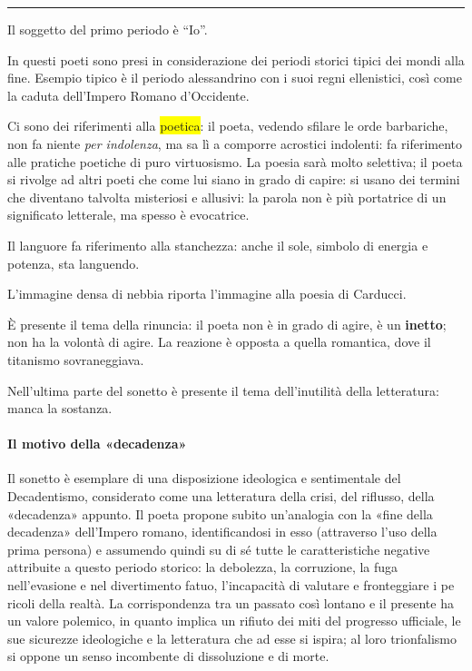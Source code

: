 \documentclass{book}
\newcommand{\pagine}[1]{\colorbox{yellow}{#1}}
\newcommand{\finepoesia}{\vspace*{1em}\hrule\vspace*{1em}}
\begin{document}
\finepoesia

Il soggetto del primo periodo è ``Io''.

In questi poeti sono presi in considerazione dei periodi storici tipici
dei mondi alla fine. Esempio tipico è il periodo alessandrino con i suoi
regni ellenistici, così come la caduta dell'Impero Romano d'Occidente.

Ci sono dei riferimenti alla \pagine{poetica}: il poeta, vedendo
sfilare le orde barbariche, non fa niente \emph{per indolenza}, ma sa lì
a comporre acrostici indolenti: fa riferimento alle pratiche poetiche di
puro virtuosismo. La poesia sarà molto selettiva; il poeta si rivolge ad
altri poeti che come lui siano in grado di capire: si usano dei termini
che diventano talvolta misteriosi e allusivi: la parola non è più
portatrice di un significato letterale, ma spesso è evocatrice.

Il languore fa riferimento alla stanchezza: anche il sole, simbolo di
energia e potenza, sta languendo.

L'immagine densa di nebbia riporta l'immagine alla poesia di Carducci.

È presente il tema della rinuncia: il poeta non è in grado di agire, è
un \textbf{inetto}; non ha la volontà di agire. La reazione è opposta a
quella romantica, dove il titanismo sovraneggiava.

Nell'ultima parte del sonetto è presente il tema dell'inutilità della
letteratura: manca la sostanza.

\paragraph{Il motivo della «decadenza»} Il sonetto è esemplare di una disposizione ideologica e sentimentale del Decadentismo, considerato come una letteratura della crisi, del riflusso, della «decadenza» appunto. Il poeta propone subito un'analogia con la «fine della decadenza» dell'Impero romano, identificandosi in esso (attraverso l'uso della prima persona) e assumendo quindi su di sé tutte le caratteristiche negative attribuite a questo periodo storico: la debolezza, la corruzione, la fuga nell'evasione e nel divertimento fatuo, l'incapacità di valutare e fronteggiare i pe ricoli della realtà. La corrispondenza tra un passato così lontano e il presente ha un valore polemico, in quanto implica un rifiuto dei miti del progresso ufficiale, le sue sicurezze ideologiche e la letteratura che ad esse si ispira; al loro trionfalismo si oppone un senso incombente di dissoluzione e di morte.
\end{document}
